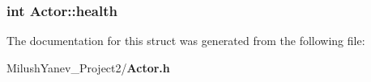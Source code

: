 \subsubsection[{health}]{\setlength{\rightskip}{0pt plus 5cm}int Actor\+::health}\label{struct_actor_a6932c660e6b6293a66b393c3c9cb151a}


The documentation for this struct was generated from the following file\+:\begin{DoxyCompactItemize}
\item 
Milush\+Yanev\+\_\+\+Project2/{\bf Actor.\+h}\end{DoxyCompactItemize}
